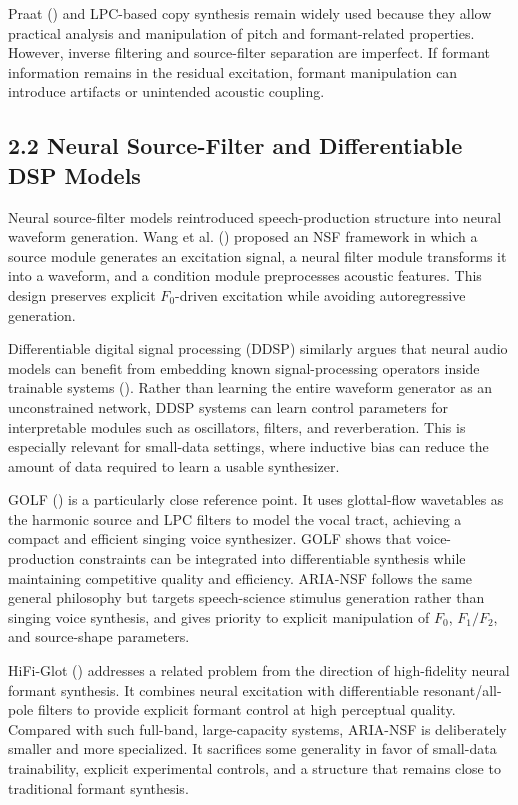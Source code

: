\documentclass[
  10pt,
]{article}
\begin{document}
Praat () and LPC-based copy
synthesis remain widely used because they allow practical analysis and
manipulation of pitch and formant-related properties. However, inverse
filtering and source-filter separation are imperfect. If formant
information remains in the residual excitation, formant manipulation can
introduce artifacts or unintended acoustic coupling.

\subsection{2.2 Neural Source-Filter and Differentiable DSP
Models}\label{neural-source-filter-and-differentiable-dsp-models}

Neural source-filter models reintroduced speech-production structure
into neural waveform generation. Wang et al.
() proposed an NSF framework in which a
source module generates an excitation signal, a neural filter module
transforms it into a waveform, and a condition module preprocesses
acoustic features. This design preserves explicit \(F_0\)-driven
excitation while avoiding autoregressive generation.

Differentiable digital signal processing (DDSP) similarly argues that
neural audio models can benefit from embedding known signal-processing
operators inside trainable systems (). Rather than learning the entire waveform generator as an
unconstrained network, DDSP systems can learn control parameters for
interpretable modules such as oscillators, filters, and reverberation.
This is especially relevant for small-data settings, where inductive
bias can reduce the amount of data required to learn a usable
synthesizer.

GOLF () is a particularly
close reference point. It uses glottal-flow wavetables as the harmonic
source and LPC filters to model the vocal tract, achieving a compact and
efficient singing voice synthesizer. GOLF shows that voice-production
constraints can be integrated into differentiable synthesis while
maintaining competitive quality and efficiency. ARIA-NSF follows the
same general philosophy but targets speech-science stimulus generation
rather than singing voice synthesis, and gives priority to explicit
manipulation of \(F_0\), \(F_1/F_2\), and source-shape parameters.

HiFi-Glot () addresses a
related problem from the direction of high-fidelity neural formant
synthesis. It combines neural excitation with differentiable
resonant/all-pole filters to provide explicit formant control at high
perceptual quality. Compared with such full-band, large-capacity
systems, ARIA-NSF is deliberately smaller and more specialized. It
sacrifices some generality in favor of small-data trainability, explicit
experimental controls, and a structure that remains close to traditional
formant synthesis.
\end{document}
